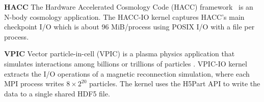
\textbf{HACC}
The Hardware Accelerated Cosmology Code (HACC) framework~\cite{habib2012}
is an N-body cosmology application.
The HACC-IO kernel captures HACC's main checkpoint I/O which is about
96 MiB/process 
using POSIX I/O with a file per process. 

\textbf{VPIC} 
Vector particle-in-cell (VPIC) is a plasma physics application that
simulates interactions among billions or trillions of particles  \cite{Bowers2008}.
VPIC-IO kernel extracts the I/O operations of a magnetic reconnection
simulation, where each MPI process writes $8 \times 2^{20}$ particles. 
The kernel uses the H5Part API \cite{H5Part} to write
the data to a single shared HDF5 file.

